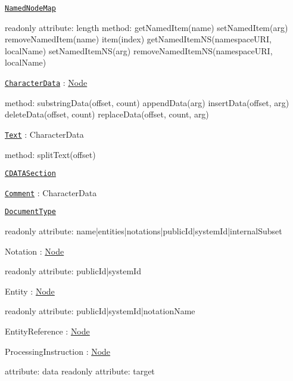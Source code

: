 \begin{DoxyItemize}
\item \href{http://www.w3.org/TR/2000/REC-DOM-Level-2-Core-20001113/core.html#ID-1780488922}{\tt Named\+Node\+Map} \begin{DoxyVerb} readonly attribute:
     length
 method:
     getNamedItem(name)
     setNamedItem(arg)
     removeNamedItem(name)
     item(index)
     getNamedItemNS(namespaceURI, localName)
     setNamedItemNS(arg)
     removeNamedItemNS(namespaceURI, localName)
\end{DoxyVerb}

\item \href{http://www.w3.org/TR/2000/REC-DOM-Level-2-Core-20001113/core.html#ID-FF21A306}{\tt Character\+Data} \+: \mbox{\hyperlink{classNode}{Node}} \begin{DoxyVerb} method:
     substringData(offset, count)
     appendData(arg)
     insertData(offset, arg)
     deleteData(offset, count)
     replaceData(offset, count, arg)
\end{DoxyVerb}

\item \href{http://www.w3.org/TR/2000/REC-DOM-Level-2-Core-20001113/core.html#ID-1312295772}{\tt Text} \+: Character\+Data \begin{DoxyVerb} method:
     splitText(offset)
\end{DoxyVerb}

\item \href{http://www.w3.org/TR/2000/REC-DOM-Level-2-Core-20001113/core.html#ID-667469212}{\tt C\+D\+A\+T\+A\+Section}
\item \href{http://www.w3.org/TR/2000/REC-DOM-Level-2-Core-20001113/core.html#ID-1728279322}{\tt Comment} \+: Character\+Data
\item \href{http://www.w3.org/TR/2000/REC-DOM-Level-2-Core-20001113/core.html#ID-412266927}{\tt Document\+Type} \begin{DoxyVerb} readonly attribute:
     name|entities|notations|publicId|systemId|internalSubset
\end{DoxyVerb}

\item Notation \+: \mbox{\hyperlink{classNode}{Node}} \begin{DoxyVerb} readonly attribute:
     publicId|systemId
\end{DoxyVerb}

\item Entity \+: \mbox{\hyperlink{classNode}{Node}} \begin{DoxyVerb} readonly attribute:
     publicId|systemId|notationName
\end{DoxyVerb}

\item Entity\+Reference \+: \mbox{\hyperlink{classNode}{Node}}
\item Processing\+Instruction \+: \mbox{\hyperlink{classNode}{Node}} \begin{DoxyVerb} attribute:
     data
 readonly attribute:
     target
\end{DoxyVerb}

\end{DoxyItemize}

